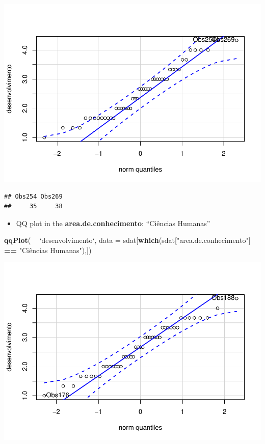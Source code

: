 \documentclass[]{article}
\newenvironment{Shaded}{\begin{snugshade}}{\end{snugshade}}
\newcommand{\DataTypeTok}[1]{\textcolor[rgb]{0.13,0.29,0.53}{#1}}
\newcommand{\KeywordTok}[1]{\textcolor[rgb]{0.13,0.29,0.53}{\textbf{#1}}}
\newcommand{\NormalTok}[1]{#1}
\newcommand{\OperatorTok}[1]{\textcolor[rgb]{0.81,0.36,0.00}{\textbf{#1}}}
\newcommand{\StringTok}[1]{\textcolor[rgb]{0.31,0.60,0.02}{#1}}
\providecommand{\tightlist}{%
  \setlength{\itemsep}{0pt}\setlength{\parskip}{0pt}}
\begin{document}
\includegraphics{factorialAnova_files/figure-latex/unnamed-chunk-25-1.pdf}

\begin{verbatim}
## Obs254 Obs269 
##     35     38
\end{verbatim}

\begin{itemize}
\tightlist
\item
  QQ plot in the \textbf{area.de.conhecimento}: ``Ciências Humanas''
\end{itemize}

\begin{Shaded}
\begin{Highlighting}[]
\KeywordTok{qqPlot}\NormalTok{( }\OperatorTok{~}\StringTok{ `}\DataTypeTok{desenvolvimento}\StringTok{`}\NormalTok{, }\DataTypeTok{data =}\NormalTok{ sdat[}\KeywordTok{which}\NormalTok{(sdat[}\StringTok{"area.de.conhecimento"}\NormalTok{] }\OperatorTok{==}\StringTok{ "Ciências Humanas"}\NormalTok{),])}
\end{Highlighting}
\end{Shaded}

\includegraphics{factorialAnova_files/figure-latex/unnamed-chunk-26-1.pdf}
\end{document}
